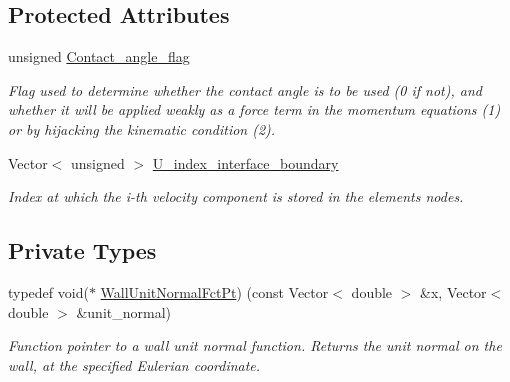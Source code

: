 \subsection*{Protected Attributes}
\begin{DoxyCompactItemize}
\item 
unsigned \hyperlink{classoomph_1_1FluidInterfaceBoundingElement_affa8d787e58ca23c2e73b4c8a2c30766}{Contact\+\_\+angle\+\_\+flag}
\begin{DoxyCompactList}\small\item\em Flag used to determine whether the contact angle is to be used (0 if not), and whether it will be applied weakly as a force term in the momentum equations (1) or by hijacking the kinematic condition (2). \end{DoxyCompactList}\item 
Vector$<$ unsigned $>$ \hyperlink{classoomph_1_1FluidInterfaceBoundingElement_a08223fefc36922f4661e30e9de16830f}{U\+\_\+index\+\_\+interface\+\_\+boundary}
\begin{DoxyCompactList}\small\item\em Index at which the i-\/th velocity component is stored in the element\textquotesingle{}s nodes. \end{DoxyCompactList}\end{DoxyCompactItemize}
\subsection*{Private Types}
\begin{DoxyCompactItemize}
\item 
typedef void($\ast$ \hyperlink{classoomph_1_1FluidInterfaceBoundingElement_a09c0b1df7d653eaf55e94e3951d409dd}{Wall\+Unit\+Normal\+Fct\+Pt}) (const Vector$<$ double $>$ \&x, Vector$<$ double $>$ \&unit\+\_\+normal)
\begin{DoxyCompactList}\small\item\em Function pointer to a wall unit normal function. Returns the unit normal on the wall, at the specified Eulerian coordinate. \end{DoxyCompactList}\end{DoxyCompactItemize}

